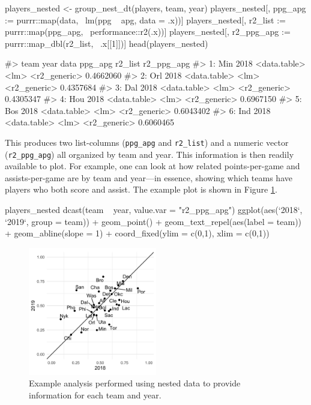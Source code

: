 \begin{Schunk}
\begin{Sinput}
players_nested <- group_nest_dt(players, team, year)
players_nested[, ppg_apg    := purrr::map(data, ~lm(ppg ~ apg, data = .x))]
players_nested[, r2_list    := purrr::map(ppg_apg, ~performance::r2(.x))]
players_nested[, r2_ppg_apg := purrr::map_dbl(r2_list, ~.x[[1]])]
head(players_nested)
\end{Sinput}
\begin{Soutput}
#>    team year         data ppg_apg      r2_list r2_ppg_apg
#> 1:  Min 2018 <data.table>    <lm> <r2_generic>  0.4662060
#> 2:  Orl 2018 <data.table>    <lm> <r2_generic>  0.4357684
#> 3:  Dal 2018 <data.table>    <lm> <r2_generic>  0.4305347
#> 4:  Hou 2018 <data.table>    <lm> <r2_generic>  0.6967150
#> 5:  Bos 2018 <data.table>    <lm> <r2_generic>  0.6043402
#> 6:  Ind 2018 <data.table>    <lm> <r2_generic>  0.6060465
\end{Soutput}
\end{Schunk}

\noindent This produces two list-columns (\texttt{ppg\_apg} and
\texttt{r2\_list}) and a numeric vector (\texttt{r2\_ppg\_apg}) all
organized by team and year. This information is then readily available
to plot. For example, one can look at how related points-per-game and
assists-per-game are by team and year---in essence, showing which teams
have players who both score and assist. The example plot is shown in
Figure \ref{exfig}.

\begin{Schunk}
\begin{Sinput}
players_nested %
  dcast(team ~ year, value.var = "r2_ppg_apg") %
  ggplot(aes(`2018`, `2019`, group = team)) +
    geom_point() +
    geom_text_repel(aes(label = team)) +
    geom_abline(slope = 1) +
    coord_fixed(ylim = c(0,1),
                xlim = c(0,1))
\end{Sinput}
\end{Schunk}

\begin{figure}[tb]
  \centering
  \includegraphics[width=0.5\textwidth]{ex_fig.png}
  \caption{Example analysis performed using nested data to provide information for each team and year.}
  \label{exfig}
\end{figure}

